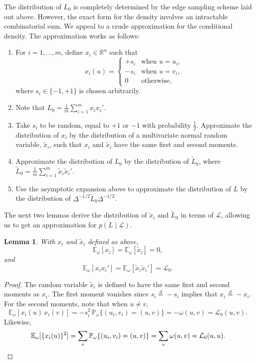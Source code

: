 \documentclass[12pt]{article}
\newcommand{\reals}{\mathbb{R}}
\newcommand{\prob}{\mathbb{P}}
\newcommand{\E}{\mathbb{E}}
\theoremstyle{plain}
\newtheorem{lemma}[theorem]{Lemma}
\begin{document}
The distribution of $L_0$ is completely determined by the edge
sampling scheme laid out above.  However, the exact form for the
density involves an intractable combinatorial sum.  We appeal to a
crude approximation for the conditional density.
The approximation works as follows:
\begin{enumerate}
\item For $i = 1, \dotsc, m$, define $x_i \in \reals^n$ such that
  \[
    x_i(u)
      =
      \begin{cases}
        +s_i &\text{when $u = u_i$,} \\
        -s_i &\text{when $u = v_i$,} \\
        0 &\text{otherwise,}
      \end{cases}
  \]
  where $s_i \in \{ -1, +1 \}$ is chosen arbitrarily.
\item Note that $L_0 = \frac{1}{m} \sum_{i=1}^m x_i x_i'$.
\item Take $s_i$ to be random, equal to $+1$ or $-1$ with probability
  $\tfrac{1}{2}$.  Approximate the distribution of $x_i$ by the
  distribution of a multivariate normal random variable, $\tilde x_i$,
  such that $x_i$ and $\tilde x_i$ have the same first and second
  moments.
\item Approximate the distribution of $L_0$ by the distribution of $\tilde L_0$, where
  \(
  \tilde L_0 = \frac{1}{m} \sum_{i=1}^m \tilde x_i \tilde x_i'.
  \)
  \item Use the asymptotic expansion above to approximate the
    distribution of $L$ by the distribution of
    $\Delta^{-1/2} \tilde L_0 \Delta^{-1/2}$.
\end{enumerate}

\noindent
The next two lemmas derive the distribution of $\tilde x_i$ and
$\tilde L_0$ in terms of $\mathcal{L}$, allowing us to get an
approximation for $p(L \mid \mathcal{L})$.

\begin{lemma}
  With $x_i$ and $\tilde x_i$ defined as above,
  \[
    \E_\omega[ x_i ] = \E_\omega[ \tilde x_i ] = 0,
  \]
  and
  \[
    \E_\omega[ x_i x_i' ] = \E_\omega [ \tilde x_i \tilde x_i' ] = \mathcal{L}_0.
  \]
\end{lemma}
\begin{proof}
The random variable $\tilde x_i$ is defined to have the same first
and second moments as $x_i$.
The first moment vanishes since $s_i \overset{d}{=} -s_i$ implies
that $x_i \overset{d}{=} -x_i$.  For the second moments, note that
when $u \neq v$, 
\[
  \E_\omega[x_i(u) \, x_i(v)]
  = -s_i^2 \, \prob_\omega\{ (u_i,v_i) = (u,v) \}  = -\omega(u,v)
  = \mathcal{L}_0(u,v).
\]
Likewise,
\[
  \E_\omega[\{x_i(u)\}^2]
      = \sum_{v} \prob_\omega\{ (u_i,v_i) = (u,v) \}
      = \sum_{v} \omega(u,v)
      = \mathcal{L}_0(u,u). \qedhere
\]
\end{proof}
\end{document}
